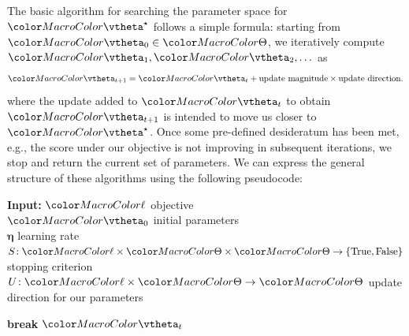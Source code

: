 The basic algorithm for searching the parameter space for $\modelparams^\star$ follows a simple formula: starting from $\modelparams_0 \in \paramspace$, we iteratively compute $\modelparams_1, \modelparams_2, \ldots$ as
\begin{equation}
\modelparams_{t + 1} = \modelparams_t + \text{update magnitude} \times \text{update direction}.
\end{equation}
where the update added to $\modelparams_t$ to obtain $\modelparams_{t+1}$ is intended to move us closer to $\modelparams^\star$. Once some pre-defined desideratum has been met, e.g., the score under our objective is not improving in subsequent iterations, we stop and return the current set of parameters. We can express the general structure of these algorithms using the following pseudocode:

\newcommand{\desiderata}{S}
\newcommand{\learningrate}{\boldsymbol\eta}
\newcommand{\updatedir}{U}
\begin{algorithm}\label{alg:param-opt}
\textbf{Input:} $\loss$ objective\\
\hspace*{3.2em} $\modelparams_0$ initial parameters \\
\hspace*{3.2em} $\learningrate\!$ learning rate \\
\hspace*{3.2em} $\desiderata \!: \loss \times \paramspace \times \paramspace \rightarrow \{\mathrm{True}, \mathrm{False}\}$ stopping criterion \\
\hspace*{3.2em} $\updatedir\!: \loss \times \paramspace \rightarrow \paramspace$ update direction for our parameters
\begin{algorithmic}[1]
\caption{Basic steps for parameter optimization. }
        \State{$\modelparams_{t + 1} \gets \modelparams_t + \learningrate_{t} \cdot \updatedir(\loss, \modelparams_t)$}
       \If{$\desiderata(\loss, \modelparams_t, \modelparams_{t-1})$}
            \State \textbf{break}
       \EndIf
    \EndFor
    \State \Return $\modelparams_{t}$
\end{algorithmic}
\end{algorithm}

